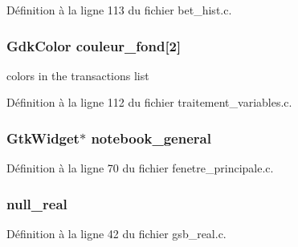 Définition à la ligne 113 du fichier bet\_\-hist.c.

\subsubsection[{couleur\_\-fond}]{\setlength{\rightskip}{0pt plus 5cm}GdkColor {\bf couleur\_\-fond}[2]}\label{bet__hist_8c_a58089bf9225ae2e274165369f8bc7a00}
colors in the transactions list 

Définition à la ligne 112 du fichier traitement\_\-variables.c.

\subsubsection[{notebook\_\-general}]{\setlength{\rightskip}{0pt plus 5cm}GtkWidget$\ast$ {\bf notebook\_\-general}}\label{bet__hist_8c_a8924516aa4170f932308e93cf93a785b}


Définition à la ligne 70 du fichier fenetre\_\-principale.c.

\subsubsection[{null\_\-real}]{ {\bf null\_\-real}}\label{bet__hist_8c_a26f304bec3fdc0651b9aa8765d4de3c6}


Définition à la ligne 42 du fichier gsb\_\-real.c.

